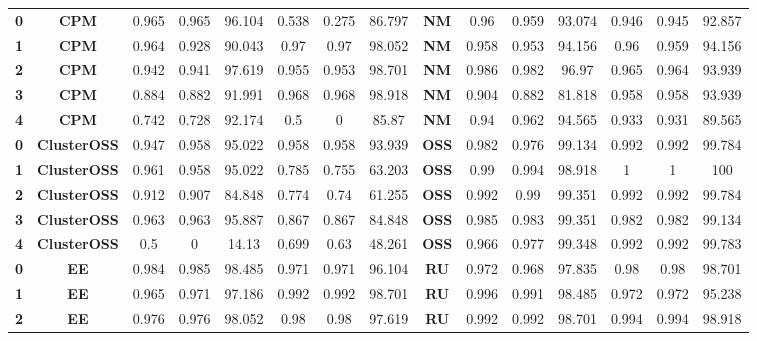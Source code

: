 {{\begin{tabular}{c|c|cccccc|ccccccc}
\textbf{0} & \textbf{CPM} & 0.965 & 0.965 & 96.104 & 0.538 & 0.275 & 86.797 & \multicolumn{1}{c|}{\textbf{NM}} & 0.96  & 0.959 & 93.074 & 0.946 & 0.945 & 92.857 \\
\textbf{1} & \textbf{CPM} & 0.964 & 0.928 & 90.043 & 0.97  & 0.97  & 98.052 & \multicolumn{1}{c|}{\textbf{NM}} & 0.958 & 0.953 & 94.156 & 0.96  & 0.959 & 94.156 \\
\textbf{2} & \textbf{CPM} & 0.942 & 0.941 & 97.619 & 0.955 & 0.953 & 98.701 & \multicolumn{1}{c|}{\textbf{NM}} & 0.986 & 0.982 & 96.97 & 0.965 & 0.964 & 93.939 \\
\textbf{3} & \textbf{CPM} & 0.884 & 0.882 & 91.991 & 0.968 & 0.968 & 98.918 & \multicolumn{1}{c|}{\textbf{NM}} & 0.904 & 0.882 & 81.818 & 0.958 & 0.958 & 93.939 \\
\textbf{4} & \textbf{CPM} & 0.742 & 0.728 & 92.174 & 0.5   & 0     & 85.87 & \multicolumn{1}{c|}{\textbf{NM}} & 0.94  & 0.962 & 94.565 & 0.933 & 0.931 & 89.565 \\
\textbf{0} & \textbf{ClusterOSS} & 0.947 & 0.958 & 95.022 & 0.958 & 0.958 & 93.939 & \multicolumn{1}{c|}{\textbf{OSS}} & 0.982 & 0.976 & 99.134 & 0.992 & 0.992 & 99.784 \\
\textbf{1} & \textbf{ClusterOSS} & 0.961 & 0.958 & 95.022 & 0.785 & 0.755 & 63.203 & \multicolumn{1}{c|}{\textbf{OSS}} & 0.99  & 0.994 & 98.918 & 1     & 1     & 100 \\
\textbf{2} & \textbf{ClusterOSS} & 0.912 & 0.907 & 84.848 & 0.774 & 0.74  & 61.255 & \multicolumn{1}{c|}{\textbf{OSS}} & 0.992 & 0.99  & 99.351 & 0.992 & 0.992 & 99.784 \\
\textbf{3} & \textbf{ClusterOSS} & 0.963 & 0.963 & 95.887 & 0.867 & 0.867 & 84.848 & \multicolumn{1}{c|}{\textbf{OSS}} & 0.985 & 0.983 & 99.351 & 0.982 & 0.982 & 99.134 \\
\textbf{4} & \textbf{ClusterOSS} & 0.5   & 0     & 14.13 & 0.699 & 0.63  & 48.261 & \multicolumn{1}{c|}{\textbf{OSS}} & 0.966 & 0.977 & 99.348 & 0.992 & 0.992 & 99.783 \\
\textbf{0} & \textbf{EE} & 0.984 & 0.985 & 98.485 & 0.971 & 0.971 & 96.104 & \multicolumn{1}{c|}{\textbf{RU}} & 0.972 & 0.968 & 97.835 & 0.98  & 0.98  & 98.701 \\
\textbf{1} & \textbf{EE} & 0.965 & 0.971 & 97.186 & 0.992 & 0.992 & 98.701 & \multicolumn{1}{c|}{\textbf{RU}} & 0.996 & 0.991 & 98.485 & 0.972 & 0.972 & 95.238 \\
\textbf{2} & \textbf{EE} & 0.976 & 0.976 & 98.052 & 0.98  & 0.98  & 97.619 & \multicolumn{1}{c|}{\textbf{RU}} & 0.992 & 0.992 & 98.701 & 0.994 & 0.994 & 98.918 \\

\end{tabular}}}

